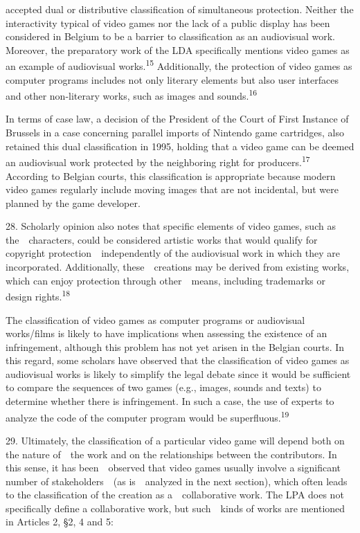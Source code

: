 \documentclass[
]{article}
\begin{document}
{accepted dual or distributive classification of simultaneous
protection. Neither the interactivity typical of video games nor the
lack of a public display has been considered in Belgium to be a barrier
to classification as an audiovisual work. Moreover, the preparatory work
of the LDA specifically mentions video games as an example of
audiovisual works.}\textsuperscript{{15 }}{Additionally, the protection
of video games as computer programs includes not only literary elements
but also user interfaces and other non-literary works, such as images
and sounds.}\textsuperscript{{16}}

{In terms of case law, a decision of the President of the Court of First
Instance of Brussels in a case concerning parallel imports of Nintendo
game cartridges, also retained this dual classification in 1995, holding
that a video game can be deemed an audiovisual work protected by the
neighboring right for producers.}\textsuperscript{{17 }}{According to
Belgian courts, this classification is appropriate because modern video
games regularly include moving images that are not incidental, but were
planned by the game developer.}

{28. }{Scholarly opinion also notes that specific elements of video
games, such as the~~characters, could be considered artistic works that
would qualify for copyright protection~~independently of the audiovisual
work in which they are incorporated. Additionally, these~~creations may
be derived from existing works, which can enjoy protection through
other~~means, including trademarks or design
rights.}\textsuperscript{{18}}

{The classification of video games as computer programs or audiovisual
works/films is likely to have implications when assessing the existence
of an infringement, although this problem has not yet arisen in the
Belgian courts. In this regard, some scholars have observed that the
classification of video games as audiovisual works is likely to simplify
the legal debate since it would be sufficient to compare the sequences
of two games (e.g., images, sounds and texts) to determine whether there
is infringement. In such a case, the use of experts to analyze the code
of the computer program would be superfluous.}\textsuperscript{{19}}

{29. }{Ultimately, the classification of a particular video game will
depend both on the nature of~~the work and on the relationships between
the contributors. In this sense, it has been~~observed that video games
usually involve a significant number of stakeholders~~(as is~~analyzed
in the next section), which often leads to the classification of the
creation as a~~collaborative work. The LPA does not specifically define
a collaborative work, but such~~kinds of works are mentioned in Articles
2, §2, 4 and 5:}
\end{document}
